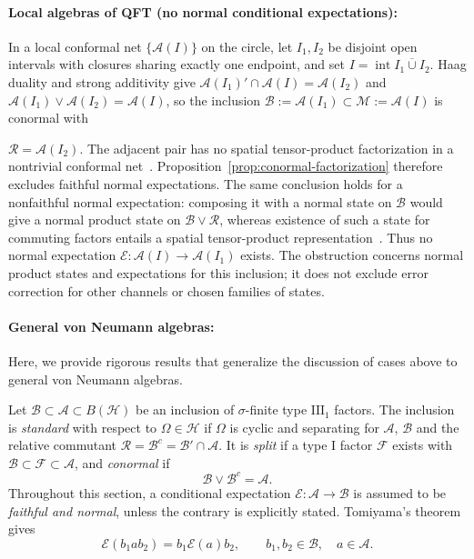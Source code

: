 \documentclass[a4paper,11pt]{article}
\theoremstyle{definition}
\newcommand{\mA}{\mathcal{A}}
\newcommand{\mB}{\mathcal{B}}
\newcommand{\mR}{\mathcal{R}}
\newcommand{\mE}{\mathcal{E}}
\begin{document}
\paragraph{Local algebras of QFT (no normal conditional expectations):}
In a local conformal net $\{\mathcal{A}(I)\}$ on the circle, let $I_1,I_2$ be disjoint
open intervals with closures sharing exactly one endpoint, and set $I=\operatorname{int}\overline{I_1\cup I_2}$.
Haag duality and strong additivity give $\mathcal{A}(I_1)'\cap\mathcal{A}(I)=\mathcal{A}(I_2)$
and $\mathcal{A}(I_1)\vee\mathcal{A}(I_2)=\mathcal{A}(I)$, so the inclusion
$\mathcal{B}:=\mathcal{A}(I_1)\subset\mathcal{M}:=\mathcal{A}(I)$ is conormal with

$\mathcal R=\mathcal A(I_2)$. The adjacent pair has no spatial tensor-product
factorization in a nontrivial conformal net~\cite{Wiesbrock1993}.
Proposition~\ref{prop:conormal-factorization} therefore excludes faithful normal
expectations. The same conclusion holds for a nonfaithful normal expectation:
composing it with a normal state on $\mathcal B$ would give a normal product
state on $\mathcal B\vee\mathcal R$, whereas existence of such a state for commuting
factors entails a spatial tensor-product representation~\cite{DoplicherLongo1984}.
Thus no normal expectation $\mE:\mathcal A(I)\to\mathcal A(I_1)$ exists.
The obstruction concerns normal product states and expectations for this inclusion;
it does not exclude error correction for other channels or chosen families of states.

\paragraph{General von Neumann algebras:}
\label{sec:conormality-expectations} Here, we provide rigorous results that generalize the discussion of cases above to general von Neumann algebras.

Let $\mB\subset\mA\subset B(\mathcal H)$ be an inclusion of
$\sigma$-finite type $\mathrm{III}_1$ factors.  The inclusion is
\emph{standard} with respect to $\Omega\in\mathcal H$ if $\Omega$ is cyclic
and separating for $\mA$, $\mB$ and the relative commutant $\mR=\mB^c=\mB'\cap \mA$. It is \emph{split} if a type I factor $\mathcal F$ exists with
$\mB\subset\mathcal F\subset\mA$, and \emph{conormal} if
\begin{equation}
 \mB\vee\mB^c=\mA.
\end{equation}
Throughout this section, a conditional expectation
$\mE:\mA\to\mB$ is assumed to be \emph{faithful and normal},
unless the contrary is explicitly stated.  Tomiyama's theorem \cite{Tomiyama1957,Tomiyama1959,Takesaki1972} gives
\begin{equation}
 \mE(b_1 a b_2)=b_1\mE(a) b_2,
 \qquad b_1,b_2\in \mB,\quad a\in \mA.
\end{equation}
\end{document}
